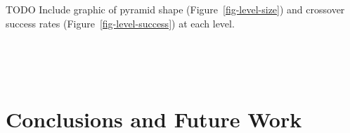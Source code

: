 \documentclass[twoside]{article}
\begin{document}
TODO Include graphic of pyramid shape (Figure~\ref{fig-level-size}) and crossover success rates (Figure~\ref{fig-level-success}) at each level.

~\cite{lobo:2011:dynamicpop}

~\cite{goldman:2011:dynamic-parameters}

\section{Conclusions and Future Work}

\small



\end{document}
